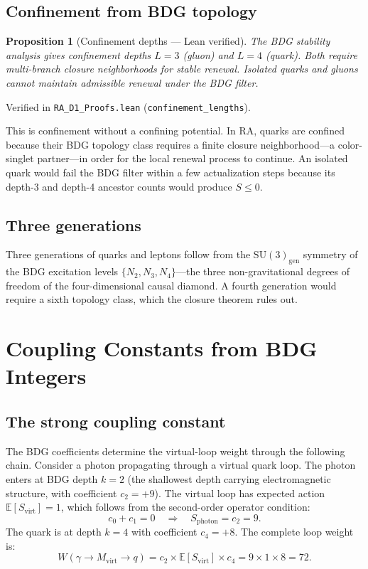 \documentclass[11pt]{article}
\newtheorem{proposition}{Proposition}
\begin{document}
\subsection{Confinement from BDG topology}

\begin{proposition}[Confinement depths --- Lean verified]
\label{prop:confinement}
The BDG stability analysis gives confinement depths $L=3$ (gluon) and $L=4$ (quark). Both require multi-branch closure neighborhoods for stable renewal. Isolated quarks and gluons cannot maintain admissible renewal under the BDG filter.
\end{proposition}
Verified in \texttt{RA\_D1\_Proofs.lean} (\texttt{confinement\_lengths}).

This is confinement without a confining potential. In RA, quarks are confined because their BDG topology class requires a finite closure neighborhood---a color-singlet partner---in order for the local renewal process to continue. An isolated quark would fail the BDG filter within a few actualization steps because its depth-3 and depth-4 ancestor counts would produce $S\le 0$.

\subsection{Three generations}

Three generations of quarks and leptons follow from the $\mathrm{SU}(3)_{\mathrm{gen}}$ symmetry of the BDG excitation levels $\{N_2,N_3,N_4\}$---the three non-gravitational degrees of freedom of the four-dimensional causal diamond. A fourth generation would require a sixth topology class, which the closure theorem rules out.

\section{Coupling Constants from BDG Integers}
\label{sec:couplings}

\subsection{The strong coupling constant}
\label{sec:alpha_s}

The BDG coefficients determine the virtual-loop weight through the following chain. Consider a photon propagating through a virtual quark loop. The photon enters at BDG depth $k=2$ (the shallowest depth carrying electromagnetic structure, with coefficient $c_2=+9$). The virtual loop has expected action $\mathbb{E}[S_{\mathrm{virt}}]=1$, which follows from the second-order operator condition:
\begin{equation}
c_0+c_1=0 \quad\Longrightarrow\quad S_{\mathrm{photon}}=c_2=9.
\end{equation}
The quark is at depth $k=4$ with coefficient $c_4=+8$. The complete loop weight is:
\begin{equation}
W(\gamma\to M_{\mathrm{virt}}\to q) = c_2\times\mathbb{E}[S_{\mathrm{virt}}]\times c_4 = 9\times 1\times 8 = 72.
\end{equation}
\end{document}
